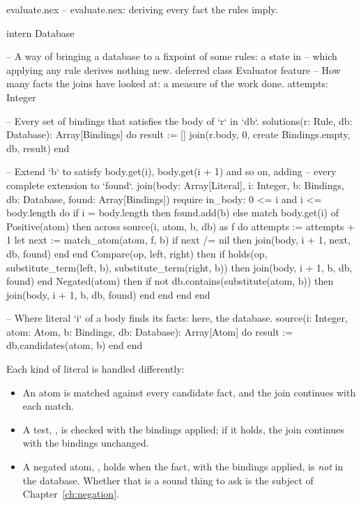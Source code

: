 \begin{newfile}{evaluate.nex}
-- evaluate.nex: deriving every fact the rules imply.

intern Database

-- A way of bringing a database to a fixpoint of some rules: a state in
-- which applying any rule derives nothing new.
deferred class Evaluator
feature
  -- How many facts the joins have looked at: a measure of the work done.
  attempts: Integer

  -- Every set of bindings that satisfies the body of `r` in `db`.
  solutions(r: Rule, db: Database): Array[Bindings]
  do
    result := []
    join(r.body, 0, create Bindings.empty, db, result)
  end

  -- Extend `b` to satisfy body.get(i), body.get(i + 1) and so on, adding
  -- every complete extension to `found`.
  join(body: Array[Literal], i: Integer, b: Bindings, db: Database, found: Array[Bindings])
  require
    in_body: 0 <= i and i <= body.length
  do
    if i = body.length then
      found.add(b)
    else
      match body.get(i) of
        Positive(atom) then
          across source(i, atom, b, db) as f do
            attempts := attempts + 1
            let next := match_atom(atom, f, b)
            if next /= nil then
              join(body, i + 1, next, db, found)
            end
          end
        Compare(op, left, right) then
          if holds(op, substitute_term(left, b), substitute_term(right, b)) then
            join(body, i + 1, b, db, found)
          end
        Negated(atom) then
          if not db.contains(substitute(atom, b)) then
            join(body, i + 1, b, db, found)
          end
      end
    end
  end

  -- Where literal `i` of a body finds its facts: here, the database.
  source(i: Integer, atom: Atom, b: Bindings, db: Database): Array[Atom]
  do
    result := db.candidates(atom, b)
  end
end
\end{newfile}

Each kind of literal is handled differently:
\begin{itemize}
  \item An atom is matched against every candidate fact, and the join
    continues with each match.
  \item A test, , is checked with the bindings applied; if it
    holds, the join continues with the bindings unchanged.
  \item A negated atom, , holds when the fact, with the
    bindings applied, is \emph{not} in the database. Whether that is a sound
    thing to ask is the subject of Chapter~\ref{ch:negation}.
\end{itemize}

